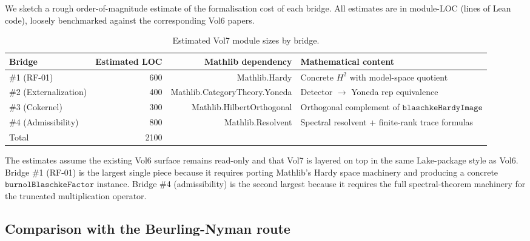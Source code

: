 \documentclass[11pt]{article}
\theoremstyle{plain}
\theoremstyle{definition}
\theoremstyle{remark}
\newcommand{\HtH}{H^{2}}
\newcommand{\code}[1]{\texttt{#1}}
\begin{document}
We sketch a rough order-of-magnitude estimate of the formalisation cost
of each bridge.  All estimates are in module-LOC (lines of Lean code),
loosely benchmarked against the corresponding Vol6 papers.

\begin{table}[h]
\centering
\begin{tabular}{@{}l r r l@{}}
\toprule
Bridge & Estimated LOC & Mathlib dependency & Mathematical content \\
\midrule
\#1 (RF-01)        &  600 & Mathlib.Hardy        & Concrete \(\HtH\)
                                                  with model-space
                                                  quotient \\
\#2 (Externalization) & 400 & Mathlib.CategoryTheory.Yoneda
                                                  & Detector $\to$ Yoneda
                                                  rep equivalence \\
\#3 (Cokernel)        & 300 & Mathlib.HilbertOrthogonal & Orthogonal
                                                  complement of
                                                  \(\code{blaschkeHardyImage}\) \\
\#4 (Admissibility)   & 800 & Mathlib.Resolvent     & Spectral resolvent
                                                  + finite-rank
                                                  trace formulas \\
\midrule
Total                 & 2100 &                       & \\
\bottomrule
\end{tabular}
\caption{Estimated Vol7 module sizes by bridge.}
\label{tab:vol7-budget}
\end{table}

The estimates assume the existing Vol6 surface remains read-only and
that Vol7 is layered on top in the same Lake-package style as Vol6.
Bridge \#1 (RF-01) is the largest single piece because it requires
porting Mathlib's Hardy space machinery and producing a concrete
\(\code{burnolBlaschkeFactor}\) instance.  Bridge \#4
(admissibility) is the second largest because it requires the
full spectral-theorem machinery for the truncated multiplication
operator.

\subsection{Comparison with the Beurling-Nyman route}
\end{document}
